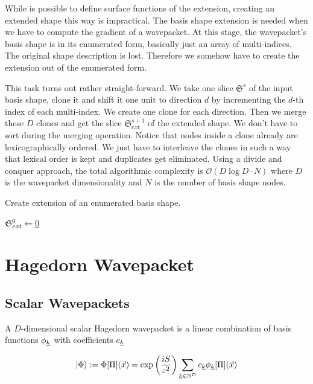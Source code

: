 \documentclass{article}
\begin{document}
While is possible to define surface functions of the extension,
creating an extended shape this way is impractical.
The basis shape extension is needed when
we have to compute the gradient of a wavepacket. At this stage,
the wavepacket's basis shape is in its enumerated form,
basically just an array of multi-indices. The original shape description is lost.
Therefore we somehow have to create the extension out of the enumerated form.
\par
This task turns out rather straight-forward. We take one slice \(\mathfrak{S}^s\) of
the input basis shape, clone it and
shift it one unit to direction \(d\) by incrementing the \(d\)-th index of each multi-index.
We create one clone for each direction. Then we merge these \(D\) clones and get the
slice \(\mathfrak{S}_{ext}^{s+1}\) of the extended shape. We don't have to sort
during the merging operation.
Notice that nodes inside a clone already are lexicographically ordered.
We just have to interleave the clones in such a way that
lexical order is kept and duplicates get eliminated.
Using a divide and conquer approach, the total algorithmic complexity is
\(\mathcal{O}(D\log{}D \cdot N)\) where \(D\) is the wavepacket dimensionality and \(N\)
is the number of basis shape nodes.

\begin{algorithm}[H]
  \caption{Create extension of an enumerated basis shape.}
  \(\mathfrak{S}_{ext}^0 \leftarrow \underline{0}\)\;
\end{algorithm}

\section{Hagedorn Wavepacket}
\subsection{Scalar Wavepackets}
A \(D\)-dimensional scalar Hagedorn wavepacket is a linear combination of basis functions \(\phi_{\underline{k}}\)
with coefficients \(c_{\underline{k}}\)

\begin{equation}
  \label{eq:scalar_hawp_inf}
  \ket{\Phi} := \Phi[\Pi](\vec{x}) = \exp{\left(\frac{iS}{\varepsilon^2}\right)} 
  \sum_{\underline{k} \in \mathbb{N}^D} c_{\underline{k}}\phi_{\underline{k}}[\Pi](\vec{x})
\end{equation}
\end{document}
